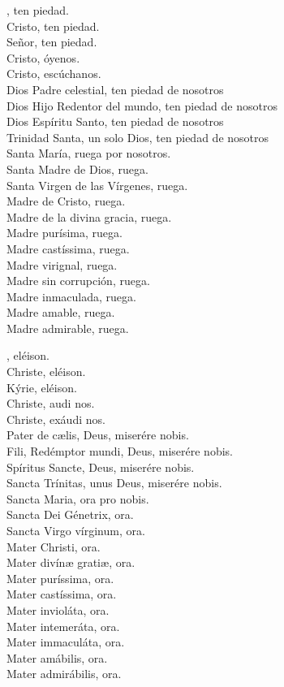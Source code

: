 \documentclass[10pt,a4paper,oneside]{book}
\begin{document}
\begin{minipage}[t]{0.475\textwidth}
    , ten piedad.\\
    Cristo, ten piedad.\\
    Señor, ten piedad.\\
    Cristo, óyenos.\\
    Cristo, escúchanos.\\
    Dios Padre celestial, ten piedad de nosotros\\
    Dios Hijo Redentor del mundo, ten piedad de nosotros\\
    Dios Espíritu Santo, ten piedad de nosotros\\
    Trinidad Santa, un solo Dios, ten piedad de nosotros\\
    Santa María, ruega por nosotros.\\
    Santa Madre de Dios, ruega.\\
    Santa Virgen de las Vírgenes, ruega.\\
    Madre de Cristo, ruega.\\
    Madre de la divina gracia, ruega.\\
    Madre purísima, ruega.\\
    Madre castíssima, ruega.\\
    Madre virignal, ruega.\\
    Madre sin corrupción, ruega.\\
    Madre inmaculada, ruega.\\
    Madre amable, ruega.\\
    Madre admirable, ruega.
\end{minipage}
\begin{minipage}[t]{0.475\textwidth}
    , eléison.\\
    Christe, eléison.\\
    Kýrie, eléison.\\
    Christe, audi nos.\\
    Christe, exáudi nos.\\
    Pater de c{\ae}lis, Deus, miserére nobis.\\
    Fili, Redémptor mundi, Deus, miserére nobis.\\
    Spíritus Sancte, Deus, miserére nobis.\\
    Sancta Trínitas, unus Deus, miserére nobis.\\
    Sancta Maria, ora pro nobis.\\
    Sancta Dei Génetrix, ora.\\
    Sancta Virgo vírginum, ora.\\
    Mater Christi, ora.\\
    Mater divín{\ae} grati{\ae}, ora.\\
    Mater puríssima, ora.\\
    Mater castíssima, ora.\\
    Mater invioláta, ora.\\
    Mater intemeráta, ora.\\
    Mater immaculáta, ora.\\
    Mater amábilis, ora.\\
    Mater admirábilis, ora.
\end{minipage}
\end{document}
